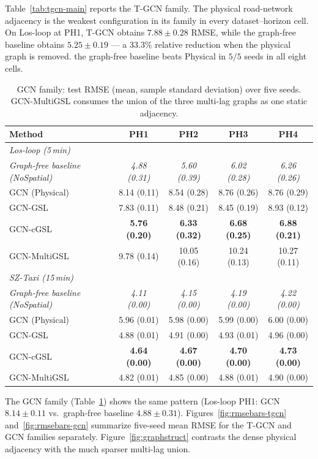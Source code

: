 Table~\ref{tab:tgcn-main} reports the T-GCN family. The physical
road-network adjacency is the weakest configuration in its family in every
dataset--horizon cell. On Los-loop at PH1, T-GCN obtains $7.88\pm 0.28$
RMSE, while the graph-free baseline obtains $5.25\pm 0.19$ --- a $33.3\%$ relative
reduction when the physical graph is removed. the graph-free baseline beats Physical in
$5/5$ seeds in all eight cells.

\begin{table}[t]
\centering
\caption{GCN family: test RMSE (mean, sample standard deviation) over five
seeds. GCN-MultiGSL consumes the union of the three multi-lag graphs as one
static adjacency.}
\label{tab:gcn-main}
\small
\begin{tabular}{lcccc}
\toprule
Method & PH1 & PH2 & PH3 & PH4 \\
\midrule
\multicolumn{5}{l}{\textit{Los-loop (5\,min)}} \\
\textit{Graph-free baseline (NoSpatial)} & \textit{4.88 (0.31)} & \textit{5.60 (0.39)} & \textit{6.02 (0.28)} & \textit{6.26 (0.26)} \\
\midrule
GCN (Physical) & 8.14 (0.11) & 8.54 (0.28) & 8.76 (0.26) & 8.76 (0.29) \\
GCN-GSL & 7.83 (0.11) & 8.48 (0.21) & 8.45 (0.19) & 8.93 (0.12) \\
GCN-cGSL & \textbf{5.76 (0.20)} & \textbf{6.33 (0.32)} & \textbf{6.68 (0.25)} & \textbf{6.88 (0.21)} \\
GCN-MultiGSL & 9.78 (0.14) & 10.05 (0.16) & 10.24 (0.13) & 10.27 (0.11) \\
\midrule
\multicolumn{5}{l}{\textit{SZ-Taxi (15\,min)}} \\
\textit{Graph-free baseline (NoSpatial)} & \textit{4.11 (0.00)} & \textit{4.15 (0.00)} & \textit{4.19 (0.00)} & \textit{4.22 (0.00)} \\
\midrule
GCN (Physical) & 5.96 (0.01) & 5.98 (0.00) & 5.99 (0.00) & 6.00 (0.00) \\
GCN-GSL & 4.88 (0.01) & 4.91 (0.00) & 4.93 (0.01) & 4.96 (0.00) \\
GCN-cGSL & \textbf{4.64 (0.00)} & \textbf{4.67 (0.00)} & \textbf{4.70 (0.00)} & \textbf{4.73 (0.00)} \\
GCN-MultiGSL & 4.82 (0.01) & 4.85 (0.00) & 4.88 (0.01) & 4.90 (0.00) \\
\bottomrule
\end{tabular}
\end{table}

The GCN family (Table~\ref{tab:gcn-main}) shows the same pattern
(Los-loop PH1: GCN $8.14\pm 0.11$ vs.\ graph-free baseline $4.88\pm 0.31$).
Figures~\ref{fig:rmsebars-tgcn} and~\ref{fig:rmsebars-gcn} summarize
five-seed mean RMSE for the T-GCN and GCN families separately.
Figure~\ref{fig:graphstruct} contrasts the dense physical adjacency with
the much sparser multi-lag union.

